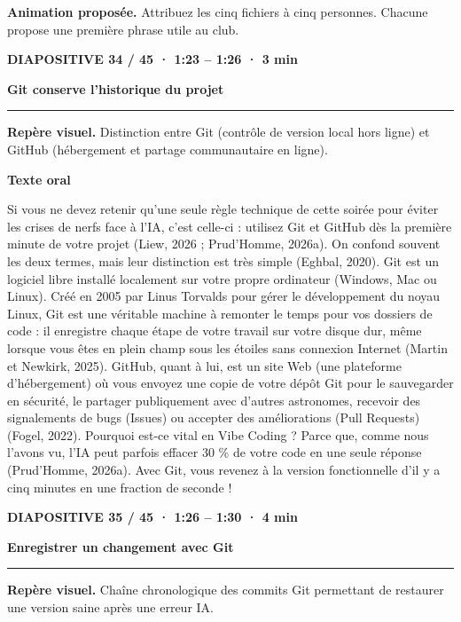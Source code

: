 \documentclass[10pt,letterpaper]{article}
\newcommand{\repere}[1]{\textcolor{accent}{\bfseries #1}\par}
\begin{document}
\smallskip\textbf{Animation proposée.} Attribuez les cinq fichiers à cinq personnes. Chacune propose une première phrase utile au club.

\clearpage\repere{DIAPOSITIVE 34 / 45 · 1:23 – 1:26 · 3 min}

{\Large\bfseries Git conserve l'historique du projet\par}

\smallskip\hrule\smallskip

{\small\textbf{Repère visuel.} Distinction entre Git (contrôle de version local hors ligne) et GitHub (hébergement et partage communautaire en ligne).\par}

\par\medskip\repere{Texte oral}

Si vous ne devez retenir qu'une seule règle technique de cette soirée pour éviter les crises de nerfs face à l'IA, c'est celle-ci : utilisez Git et GitHub dès la première minute de votre projet (Liew, 2026 ; Prud'Homme, 2026a). On confond souvent les deux termes, mais leur distinction est très simple (Eghbal, 2020). Git est un logiciel libre installé localement sur votre propre ordinateur (Windows, Mac ou Linux). Créé en 2005 par Linus Torvalds pour gérer le développement du noyau Linux, Git est une véritable machine à remonter le temps pour vos dossiers de code : il enregistre chaque étape de votre travail sur votre disque dur, même lorsque vous êtes en plein champ sous les étoiles sans connexion Internet (Martin et Newkirk, 2025). GitHub, quant à lui, est un site Web (une plateforme d'hébergement) où vous envoyez une copie de votre dépôt Git pour le sauvegarder en sécurité, le partager publiquement avec d'autres astronomes, recevoir des signalements de bugs (Issues) ou accepter des améliorations (Pull Requests) (Fogel, 2022). Pourquoi est-ce vital en Vibe Coding ? Parce que, comme nous l'avons vu, l'IA peut parfois effacer 30 \% de votre code en une seule réponse (Prud'Homme, 2026a). Avec Git, vous revenez à la version fonctionnelle d'il y a cinq minutes en une fraction de seconde !\par

\clearpage\repere{DIAPOSITIVE 35 / 45 · 1:26 – 1:30 · 4 min}

{\Large\bfseries Enregistrer un changement avec Git\par}

\smallskip\hrule\smallskip

{\small\textbf{Repère visuel.} Chaîne chronologique des commits Git permettant de restaurer une version saine après une erreur IA.\par}
\end{document}
